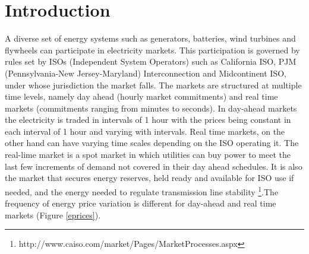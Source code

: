 \documentclass[11pt,twoside]{article}
\begin{document}
\section{Introduction}
A diverse set of energy systems such as generators, batteries, wind turbines and flywheels can participate in electricity markets. This participation is governed by rules set by ISOs (Independent System Operators) such as California ISO, PJM (Pennsylvania-New Jersey-Maryland) Interconnection and Midcontinent ISO, under whose jurisdiction the market falls. The markets are structured at multiple time levels, namely day ahead (hourly market commitments) and real time markets (commitments ranging from minutes to seconds). In day-ahead markets the electricity is traded in intervals of 1 hour with the prices being constant in each interval of 1 hour and varying with intervals. Real time markets, on the other hand can have varying time scales depending on the ISO operating it. The real-lime market is a spot market in which utilities can buy power to meet the last few increments of demand not covered in their day ahead schedules. It is also the market that secures energy reserves, held ready and available for ISO use if needed, and the energy needed to regulate transmission line stability \footnote{http://www.caiso.com/market/Pages/MarketProcesses.aspx}.The frequency of energy price variation is different for day-ahead and real time markets (Figure \ref{eprices}). 
\end{document}
